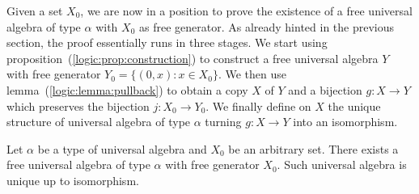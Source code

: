 Given a set $X_{0}$, we are now in a position to prove the existence
of a free universal algebra of type $\alpha$ with $X_{0}$ as free
generator. As already hinted in the previous section, the proof
essentially runs in three stages. We start using
proposition~(\ref{logic:prop:construction}) to construct a free
universal algebra $Y$ with free generator $Y_{0}=\{(0,x):x\in
X_{0}\}$. We then use lemma~(\ref{logic:lemma:pullback}) to obtain a
copy $X$ of $Y$ and a bijection $g:X\to Y$ which preserves the
bijection $j:X_{0}\to Y_{0}$. We finally define on $X$ the unique
structure of universal algebra of type $\alpha$ turning $g:X\to Y$
into an isomorphism.
\begin{theorem}\label{logic:the:main:existence}
Let $\alpha$ be a type of universal algebra and $X_{0}$ be an
arbitrary set. There exists a free universal algebra of type
$\alpha$ with free generator $X_{0}$. Such universal algebra is
unique up to isomorphism.
\end{theorem}
